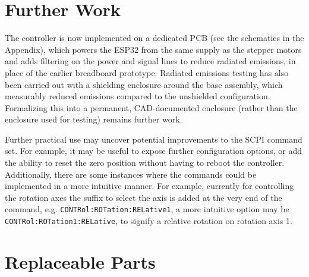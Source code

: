 
\newpage
\section{Further Work}

The controller is now implemented on a dedicated PCB (see the schematics in the Appendix), which powers the ESP32 from the same supply as the stepper motors and adds filtering on the power and signal lines to reduce radiated emissions, in place of the earlier breadboard prototype. Radiated emissions testing has also been carried out with a shielding enclosure around the base assembly, which measurably reduced emissions compared to the unshielded configuration. Formalizing this into a permanent, CAD-documented enclosure (rather than the enclosure used for testing) remains further work.

Further practical use may uncover potential improvements to the SCPI command set. For example, it may be useful to expose further configuration options, or add the ability to reset the zero position without having to reboot the controller. Additionally, there are some instances where the commands could be implemented in a more intuitive manner. For example, currently for controlling the rotation axes the suffix to select the axis is added at the very end of the command, e.g. \texttt{CONTRol:ROTation:RELative1}, a more intuitive option may be \texttt{CONTRol:ROTation1:RELative}, to signify a relative rotation on rotation axis 1.

\newpage



\appendix
\newpage
\section{Replaceable Parts}

